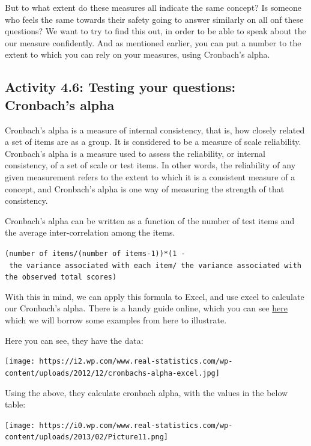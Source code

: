 \documentclass[
]{book}
\begin{document}
But to what extent do these measures all indicate the same concept? Is someone who feels the same towards their safety going to answer similarly on all onf these questions? We want to try to find this out, in order to be able to speak about the our measure confidently. And as mentioned earlier, you can put a number to the extent to which you can rely on your measures, using Cronbach's alpha.

\hypertarget{activity-4.6-testing-your-questions-cronbachs-alpha}{%
\subsection{Activity 4.6: Testing your questions: Cronbach's alpha}\label{activity-4.6-testing-your-questions-cronbachs-alpha}}

Cronbach's alpha is a measure of internal consistency, that is, how closely related a set of items are as a group. It is considered to be a measure of scale reliability. Cronbach's alpha is a measure used to assess the reliability, or internal consistency, of a set of scale or test items. In other words, the reliability of any given measurement refers to the extent to which it is a consistent measure of a concept, and Cronbach's alpha is one way of measuring the strength of that consistency.

Cronbach's alpha can be written as a function of the number of test items and the average inter-correlation among the items.

\texttt{(number\ of\ items/(number\ of\ items-1))*(1\ -\ the\ variance\ associated\ with\ each\ item/\ the\ variance\ associated\ with\ the\ observed\ total\ scores)}

With this in mind, we can apply this formula to Excel, and use excel to calculate our Cronbach's alpha. There is a handy guide online, which you can see \href{http://www.real-statistics.com/reliability/internal-consistency-reliability/cronbachs-alpha/}{here} which we will borrow some examples from here to illustrate.

Here you can see, they have the data:

\texttt{[image: https://i2.wp.com/www.real-statistics.com/wp-content/uploads/2012/12/cronbachs-alpha-excel.jpg]}

Using the above, they calculate cronbach alpha, with the values in the below table:

\texttt{[image: https://i0.wp.com/www.real-statistics.com/wp-content/uploads/2013/02/Picture11.png]}
\end{document}
